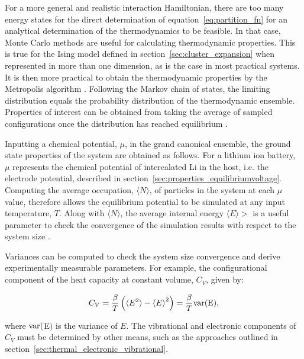 \documentclass[../main.tex]{subfiles}
\begin{document}
For a more general and realistic interaction Hamiltonian, there are too many energy states for the direct determination of equation~\ref{eq:partition_fn} for an analytical determination of the thermodynamics to be feasible. In that case, Monte Carlo methods are useful for calculating thermodynamic properties. This is true for the Ising model defined in section~\ref{sec:cluster_expansion} when represented in more than one dimension, as is the case in most practical systems.  It is then more practical to obtain the thermodynamic properties by the Metropolis algorithm \cite{Metropolis1953}. Following the Markov chain of states, the limiting distribution equals the probability distribution of the thermodynamic ensemble. Properties of interest can be obtained from taking the average of sampled configurations once the distribution has reached equilibrium \cite{oviedo2015underpotential}.

Inputting a chemical potential, $\mu$, in the grand canonical ensemble, the ground state properties of the system are obtained as follows. For a lithium ion battery, $\mu$ represents the chemical potential of intercalated Li in the host, i.e. the electrode potential, described in section~\ref{sec:properties_equilibriumvoltage}. Computing the average occupation, $\langle N \rangle$, of particles in the system at each $\mu$ value, therefore allows the equilibrium potential to be simulated at any input temperature, $T$. Along with $\langle N \rangle$, the average internal energy $\langle{E}\rangle>$ is a useful parameter to check the convergence of the simulation results with respect to the system size \cite{mercer_influence_2017,Binder2009book,Kim2001h,darling1999}.

Variances can be computed to check the system size convergence and derive experimentally measurable parameters. For example, the configurational component of the heat capacity at constant volume, $C_{V}$, given by:

\begin{equation}
    C_{V} = \frac{\beta}{T}\left(\langle{E^{2}}\rangle -{\langle{E}\rangle}^{2}\right) =  \frac{\beta}{T}\rm{var}(E),
    \label{eq:mc_heat_cap}
\end{equation}

where $\rm{var}($E$)$ is the variance of $E$. The vibrational and electronic components of $C_{V}$ must be determined by other means, such as the approaches outlined in section~\ref{sec:thermal_electronic_vibrational}. 
\end{document}
